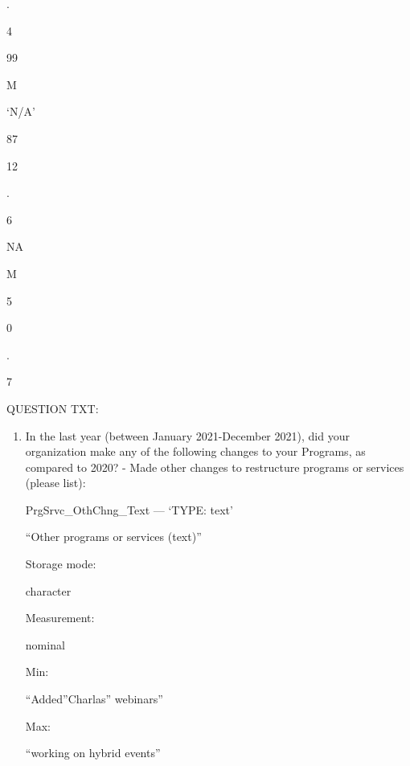 \documentclass[
  letterpaper,
]{scrbook}
\providecommand{\tightlist}{%
  \setlength{\itemsep}{0pt}\setlength{\parskip}{0pt}}\usepackage{longtable,booktabs,array}
\begin{document}
\begin{enumerate}
\begin{enumerate}
\begin{enumerate}
\begin{enumerate}
\begin{enumerate}
\begin{enumerate}
\begin{enumerate}
\begin{enumerate}
\begin{enumerate}
\begin{enumerate}
\begin{enumerate}
\begin{enumerate}
\begin{enumerate}
                          .

                          4

                          99

                          M

                          `N/A'

                          87

                          12

                          .

                          6

                          NA

                          M

                          5

                          0

                          .

                          7

                          QUESTION TXT:

                          \begin{enumerate}
                          \def\labelenumxiv{\arabic{enumxiv}.}
                          \tightlist
                          \item
                            In the last year (between January
                            2021-December 2021), did your organization
                            make any of the following changes to your
                            Programs, as compared to 2020? - Made other
                            changes to restructure programs or services
                            (please list):

                            PrgSrvc\_OthChng\_Text --- {`TYPE: text'}

                            ``Other programs or services (text)''

                            Storage mode:

                            character

                            Measurement:

                            nominal

                            Min:

                            ``Added''Charlas'' webinars''

                            Max:

                            ``working on hybrid events''


\end{enumerate}
\end{enumerate}
\end{enumerate}
\end{enumerate}
\end{enumerate}
\end{enumerate}
\end{enumerate}
\end{enumerate}
\end{enumerate}
\end{enumerate}
\end{enumerate}
\end{enumerate}
\end{enumerate}
\end{enumerate}
\end{document}

